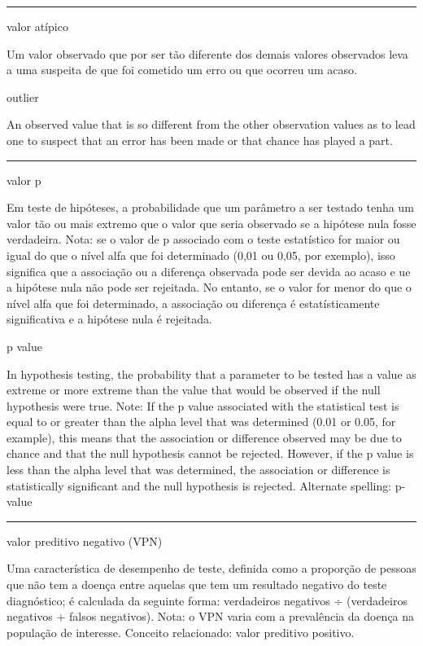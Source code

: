 \documentclass[
  openany]{book}
\begin{document}
\begin{center}\rule{0.5\linewidth}{0.5pt}\end{center}

valor atípico

Um valor observado que por ser tão diferente dos demais valores observados leva a uma suspeita de que foi cometido um erro ou que ocorreu um acaso.

outlier

An observed value that is so different from the other observation values as to lead one to suspect that an error has been made or that chance has played a part.

\begin{center}\rule{0.5\linewidth}{0.5pt}\end{center}

valor p

Em teste de hipóteses, a probabilidade que um parâmetro a ser testado tenha um valor tão ou mais extremo que o valor que seria observado se a hipótese nula fosse verdadeira. Nota: se o valor de p associado com o teste estatístico for maior ou igual do que o nível alfa que foi determinado (0,01 ou 0,05, por exemplo), isso significa que a associação ou a diferença observada pode ser devida ao acaso e ue a hipótese nula não pode ser rejeitada. No entanto, se o valor for menor do que o nível alfa que foi determinado, a associação ou diferença é estatísticamente significativa e a hipótese nula é rejeitada.

p value

In hypothesis testing, the probability that a parameter to be tested has a value as extreme or more extreme than the value that would be observed if the null hypothesis were true. Note: If the p value associated with the statistical test is equal to or greater than the alpha level that was determined (0.01 or 0.05, for example), this means that the association or difference observed may be due to chance and that the null hypothesis cannot be rejected. However, if the p value is less than the alpha level that was determined, the association or difference is statistically significant and the null hypothesis is rejected. Alternate spelling: p-value

\begin{center}\rule{0.5\linewidth}{0.5pt}\end{center}

valor preditivo negativo (VPN)

Uma característica de desempenho de teste, definida como a proporção de pessoas que não tem a doença entre aquelas que tem um resultado negativo do teste diagnóstico; é calculada da seguinte forma: verdadeiros negativos ÷ (verdadeiros negativos + falsos negativos). Nota: o VPN varia com a prevalência da doença na população de interesse. Conceito relacionado: valor preditivo positivo.
\end{document}
